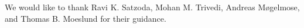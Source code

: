 We would like to thank Ravi K. Satzoda, Mohan M. Trivedi, Andreas Møgelmose, and Thomas B. Moeslund for their guidance. 
